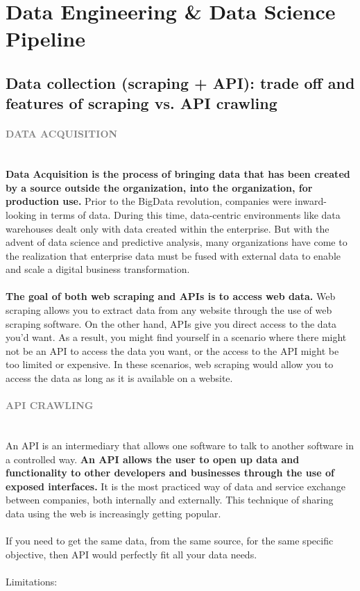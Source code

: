 \documentclass[10pt,a4paper]{article}
\newcommand{\nline}{\\~\\}
\newcommand{\myparagraph}[1]{\paragraph{\normalsize{\textcolor{gray}{\uppercase{\textbf{#1}}}} }\mbox{} \vspace{0.5em}\\}
\begin{document}
\section{Data Engineering \& Data Science Pipeline}
\subsection{Data collection (scraping + API): trade off and features of scraping vs. API crawling}
\myparagraph{Data Acquisition}
\textbf{Data Acquisition is the process of bringing data that has been created by a source outside the organization, into the organization, for production use. }Prior to the BigData revolution, companies were inward-looking in terms of data. During this time, data-centric environments like data warehouses dealt only with data created within the enterprise. But with the advent of data science and predictive analysis, many organizations have come to the realization that enterprise data must be fused with external data to enable and scale a digital business transformation.
\nline
\textbf{The goal of both web scraping and APIs is to access web data.}
Web scraping allows you to extract data from any website through the use of web scraping software. On the other hand, APIs give you direct access to the data you’d want. As a result, you might find yourself in a scenario where there might not be an API to access the data you want, or the access to the API might be too limited or expensive. In these scenarios, web scraping would allow you to access the data as long as it is available on a website.
\myparagraph{API crawling}
An API is an intermediary that allows one software to talk to another software in a controlled way. \textbf{An API allows the user to open up data and functionality to other developers and businesses through the use of exposed interfaces.} It is the most practiced way of data and service exchange between companies, both internally and externally. This technique of sharing data using the web is increasingly getting popular. 
\nline
If you need to get the same data, from the same source, for the same specific objective, then API would perfectly fit all your data needs. 
\nline
Limitations:
\end{document}
